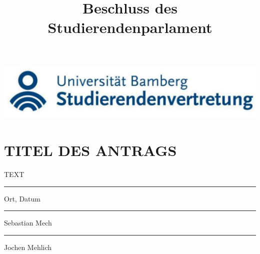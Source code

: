 \documentclass{article}
\title{Beschluss des Studierendenparlament}
\begin{document}
\begin{center}
    \includegraphics[width=\textwidth]{stuve-logo.png}
\end{center}

\section*{TITEL DES ANTRAGS}

\vspace{50px}

TEXT

\vspace{100px}


\parbox{5cm}{\hrule
\strut \centering\footnotesize Ort, Datum} 

\vspace{50px}

\parbox{5cm}{\hrule
\strut \centering\footnotesize Sebastian Mech} \hfill\parbox{5cm}{\hrule
\strut \centering\footnotesize Jochen Mehlich}
\end{document}
